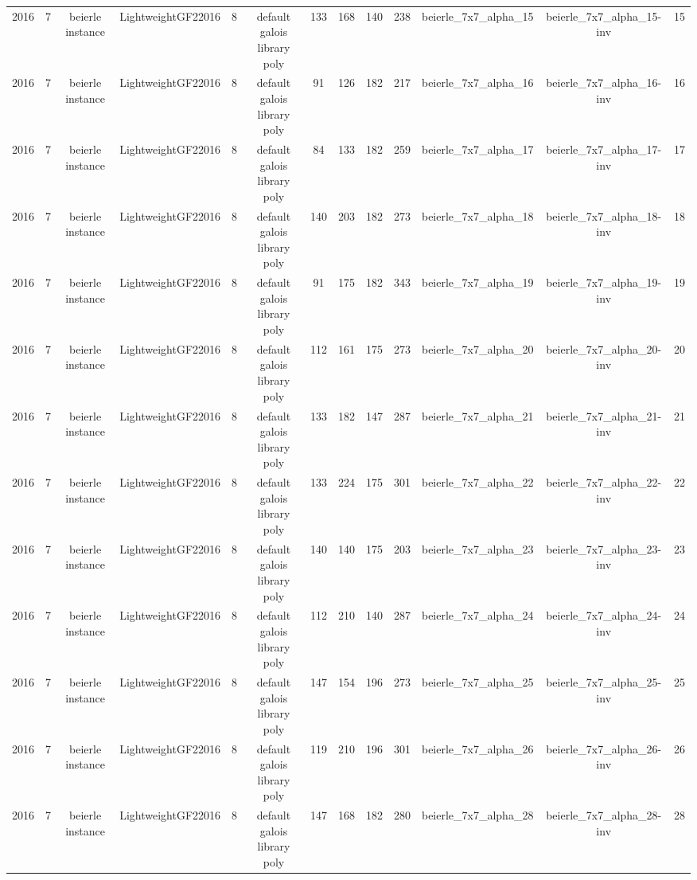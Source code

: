 \begin{tabular}{c c c c c c c c c c c c c}
2016 & 7 & beierle instance & LightweightGF22016 & 8 & default galois library poly & 133 & 168 & 140 & 238 & beierle_7x7_alpha_15 & beierle_7x7_alpha_15-inv & 15 \\
2016 & 7 & beierle instance & LightweightGF22016 & 8 & default galois library poly & 91 & 126 & 182 & 217 & beierle_7x7_alpha_16 & beierle_7x7_alpha_16-inv & 16 \\
2016 & 7 & beierle instance & LightweightGF22016 & 8 & default galois library poly & 84 & 133 & 182 & 259 & beierle_7x7_alpha_17 & beierle_7x7_alpha_17-inv & 17 \\
2016 & 7 & beierle instance & LightweightGF22016 & 8 & default galois library poly & 140 & 203 & 182 & 273 & beierle_7x7_alpha_18 & beierle_7x7_alpha_18-inv & 18 \\
2016 & 7 & beierle instance & LightweightGF22016 & 8 & default galois library poly & 91 & 175 & 182 & 343 & beierle_7x7_alpha_19 & beierle_7x7_alpha_19-inv & 19 \\
2016 & 7 & beierle instance & LightweightGF22016 & 8 & default galois library poly & 112 & 161 & 175 & 273 & beierle_7x7_alpha_20 & beierle_7x7_alpha_20-inv & 20 \\
2016 & 7 & beierle instance & LightweightGF22016 & 8 & default galois library poly & 133 & 182 & 147 & 287 & beierle_7x7_alpha_21 & beierle_7x7_alpha_21-inv & 21 \\
2016 & 7 & beierle instance & LightweightGF22016 & 8 & default galois library poly & 133 & 224 & 175 & 301 & beierle_7x7_alpha_22 & beierle_7x7_alpha_22-inv & 22 \\
2016 & 7 & beierle instance & LightweightGF22016 & 8 & default galois library poly & 140 & 140 & 175 & 203 & beierle_7x7_alpha_23 & beierle_7x7_alpha_23-inv & 23 \\
2016 & 7 & beierle instance & LightweightGF22016 & 8 & default galois library poly & 112 & 210 & 140 & 287 & beierle_7x7_alpha_24 & beierle_7x7_alpha_24-inv & 24 \\
2016 & 7 & beierle instance & LightweightGF22016 & 8 & default galois library poly & 147 & 154 & 196 & 273 & beierle_7x7_alpha_25 & beierle_7x7_alpha_25-inv & 25 \\
2016 & 7 & beierle instance & LightweightGF22016 & 8 & default galois library poly & 119 & 210 & 196 & 301 & beierle_7x7_alpha_26 & beierle_7x7_alpha_26-inv & 26 \\
2016 & 7 & beierle instance & LightweightGF22016 & 8 & default galois library poly & 147 & 168 & 182 & 280 & beierle_7x7_alpha_28 & beierle_7x7_alpha_28-inv & 28 \\

\end{tabular}
